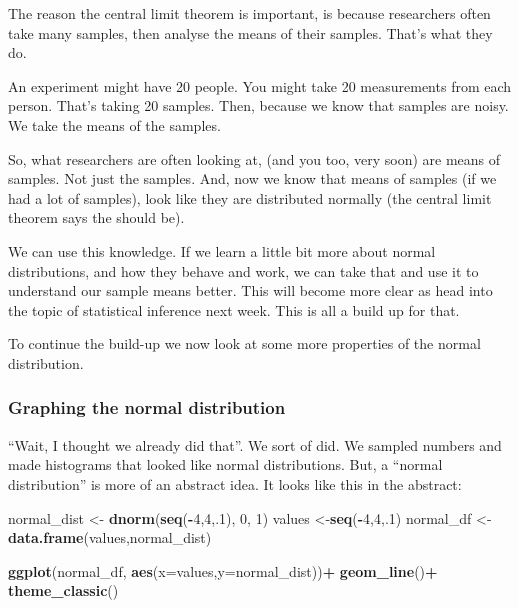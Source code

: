 \documentclass[
]{book}
\newenvironment{Shaded}{\begin{snugshade}}{\end{snugshade}}
\newcommand{\AttributeTok}[1]{\textcolor[rgb]{0.13,0.29,0.53}{#1}}
\newcommand{\DecValTok}[1]{\textcolor[rgb]{0.00,0.00,0.81}{#1}}
\newcommand{\FunctionTok}[1]{\textcolor[rgb]{0.13,0.29,0.53}{\textbf{#1}}}
\newcommand{\NormalTok}[1]{#1}
\newcommand{\OtherTok}[1]{\textcolor[rgb]{0.56,0.35,0.01}{#1}}
\newcommand{\SpecialCharTok}[1]{\textcolor[rgb]{0.81,0.36,0.00}{\textbf{#1}}}
\begin{document}
The reason the central limit theorem is important, is because
researchers often take many samples, then analyse the means of their
samples. That's what they do.

An experiment might have 20 people. You might take 20 measurements from
each person. That's taking 20 samples. Then, because we know that
samples are noisy. We take the means of the samples.

So, what researchers are often looking at, (and you too, very soon) are
means of samples. Not just the samples. And, now we know that means of
samples (if we had a lot of samples), look like they are distributed
normally (the central limit theorem says the should be).

We can use this knowledge. If we learn a little bit more about normal
distributions, and how they behave and work, we can take that and use it
to understand our sample means better. This will become more clear as
head into the topic of statistical inference next week. This is all a
build up for that.

To continue the build-up we now look at some more properties of the
normal distribution.

\hypertarget{graphing-the-normal-distribution}{%
\subsubsection{Graphing the normal distribution}\label{graphing-the-normal-distribution}}

``Wait, I thought we already did that''. We sort of did. We sampled
numbers and made histograms that looked like normal distributions. But,
a ``normal distribution'' is more of an abstract idea. It looks like this
in the abstract:

\begin{Shaded}
\begin{Highlighting}[]
\NormalTok{normal\_dist }\OtherTok{\textless{}{-}} \FunctionTok{dnorm}\NormalTok{(}\FunctionTok{seq}\NormalTok{(}\SpecialCharTok{{-}}\DecValTok{4}\NormalTok{,}\DecValTok{4}\NormalTok{,.}\DecValTok{1}\NormalTok{), }\DecValTok{0}\NormalTok{, }\DecValTok{1}\NormalTok{)}
\NormalTok{values }\OtherTok{\textless{}{-}}\FunctionTok{seq}\NormalTok{(}\SpecialCharTok{{-}}\DecValTok{4}\NormalTok{,}\DecValTok{4}\NormalTok{,.}\DecValTok{1}\NormalTok{)}
\NormalTok{normal\_df }\OtherTok{\textless{}{-}}\FunctionTok{data.frame}\NormalTok{(values,normal\_dist)}

\FunctionTok{ggplot}\NormalTok{(normal\_df, }\FunctionTok{aes}\NormalTok{(}\AttributeTok{x=}\NormalTok{values,}\AttributeTok{y=}\NormalTok{normal\_dist))}\SpecialCharTok{+}
  \FunctionTok{geom\_line}\NormalTok{()}\SpecialCharTok{+}
  \FunctionTok{theme\_classic}\NormalTok{()}
\end{Highlighting}
\end{Shaded}
\end{document}
